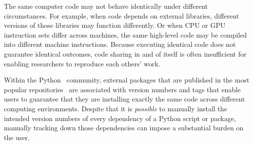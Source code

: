 \documentclass[preprint,12pt, a4paper]{elsarticle}
\begin{document}
The same computer code may not behave identically under different
circumstances.  For example, when code depends on external libraries,
different versions of those libraries may function differently.  Or
when CPU or GPU instruction sets differ across machines, the same
high-level code may be compiled into different machine instructions.
Because executing identical code does not guarantee identical
outcomes, code sharing in and of itself is often insufficient for
enabling researchers to reproduce each others' work.

Within the Python~\citep{vanR95} community, external
packages that are published in the most popular
repositories~\citep{pypi, Anac12} are associated with version numbers
and tags that enable users to guarantee that they are installing
exactly the same code across different computing environments.
Despite that it is \textit{possible} to manually install the intended
version numbers of every dependency of a Python script or package, manually
tracking down those dependencies can impose a substantial burden on
the user.
\end{document}
